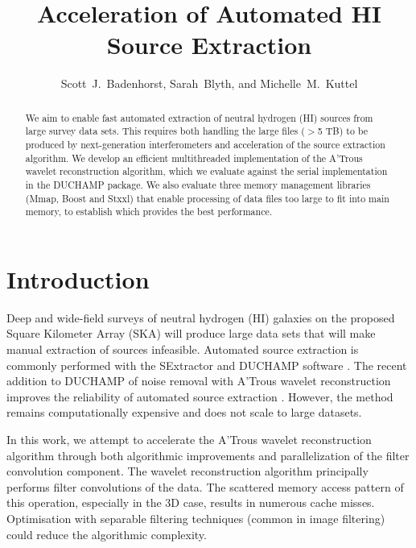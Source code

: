 
\resetcounters





\title{Acceleration of Automated HI Source Extraction} 

\author{Scott~J.~Badenhorst, Sarah~Blyth, and Michelle~M.~Kuttel
}


\begin{abstract}
We aim to enable fast automated extraction of neutral hydrogen (HI)  sources from large survey data sets. 
This requires both handling the large files ($>$5 TB) to be produced by next-generation interferometers and acceleration of  the source extraction algorithm. 
We develop an efficient multithreaded implementation of the A'Trous wavelet reconstruction algorithm, which we evaluate against the serial implementation in the DUCHAMP package.  We also evaluate three memory management libraries (Mmap, Boost and Stxxl) that enable processing of data files too large to fit into main memory, to establish which provides the best performance. 
\end{abstract}

\section{Introduction}

Deep and wide-field surveys of neutral hydrogen (HI) galaxies on the proposed Square Kilometer Array (SKA) will produce 
large data sets that will make manual extraction of sources infeasible.  Automated source extraction is commonly performed with the SExtractor \citep{Bertin1996} and DUCHAMP software \citep{Whiting2012}.  
 The recent addition to DUCHAMP of  noise removal with A'Trous wavelet reconstruction \citep{West2010} improves the reliability of automated source extraction \citep{Popping2012, Whiting2012}.  
However, the method remains computationally expensive and does not scale to large datasets.  

In this work, we attempt to accelerate the A'Trous wavelet reconstruction algorithm through both algorithmic improvements and parallelization of the filter convolution component. 
The wavelet reconstruction algorithm  principally performs filter convolutions of the data. The scattered memory access pattern of this operation, especially in the 3D case, results in numerous cache misses.  Optimisation with separable filtering techniques (common in image filtering) could reduce the algorithmic complexity. 

